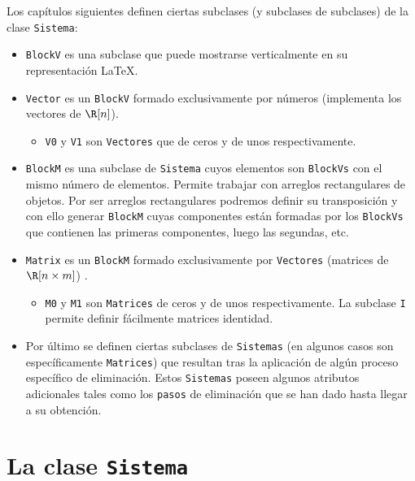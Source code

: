 \documentclass[11pt]{report}
\begin{document}
Los capítulos siguientes definen ciertas subclases (y subclases de subclases) de la clase \texttt{Sistema}:

\begin{itemize}
\item \texttt{BlockV} es una subclase que puede mostrarse verticalmente en su representación \LaTeX{}.

\item \texttt{Vector} es un \texttt{BlockV} formado exclusivamente por números (implementa los vectores de \(\R[n]\)).

\begin{itemize}
\item \texttt{V0} y \texttt{V1} son \texttt{Vectores} que de ceros y de unos respectivamente.
\end{itemize}

\item \texttt{BlockM} es una subclase de \texttt{Sistema} cuyos elementos son \texttt{BlockVs} con el mismo número de
elementos. Permite trabajar con arreglos rectangulares de objetos. Por ser arreglos rectangulares
podremos definir su transposición y con ello generar \texttt{BlockM} cuyas componentes están formadas por
los \texttt{BlockVs} que contienen las primeras componentes, luego las segundas, etc.

\item \texttt{Matrix} es un \texttt{BlockM} formado exclusivamente por \texttt{Vectores} (matrices de \(\R[n\times m]\)) .

\begin{itemize}
\item \texttt{M0} y \texttt{M1} son \texttt{Matrices} de ceros y de unos respectivamente. La subclase \texttt{I} permite definir
fácilmente matrices identidad.
\end{itemize}

\item Por último se definen ciertas subclases de \texttt{Sistemas} (en algunos casos son específicamente
\texttt{Matrices}) que resultan tras la aplicación de algún proceso específico de eliminación. Estos
\texttt{Sistemas} poseen algunos atributos adicionales tales como los \texttt{pasos} de eliminación que se han
dado hasta llegar a su obtención.
\end{itemize}


\chapter{La clase \texttt{Sistema}}
\label{sec:org5b518ce}
\end{document}
